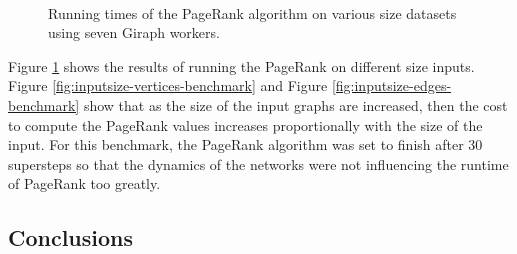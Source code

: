 \begin{figure}[htbp]
  \centering {}
  ~ 
  ~
  \caption{Running times of the PageRank algorithm on various size datasets using seven Giraph workers.}
  \label{fig:inputsize-benchmark}
\end{figure}

Figure \ref{fig:inputsize-benchmark} shows the results of running the PageRank on different size inputs. Figure \ref{fig:inputsize-vertices-benchmark} and Figure \ref{fig:inputsize-edges-benchmark} show that as the size of the input graphs are increased, then the cost to compute the PageRank values increases proportionally with the size of the input. For this benchmark, the PageRank algorithm was set to finish after 30 supersteps so that the dynamics of the networks were not influencing the runtime of PageRank too greatly.

\subsection{Conclusions}
